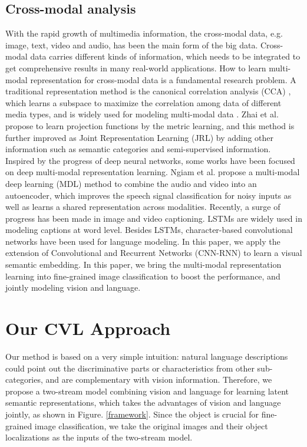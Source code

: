 \documentclass[10pt,twocolumn,letterpaper]{article}
\begin{document}
\subsection{Cross-modal analysis}
With the rapid growth of multimedia information, the cross-modal data, e.g. image, text, video and audio, has been the main form of the big data. Cross-modal data carries different kinds of information, which needs to be integrated to get comprehensive results in many real-world applications. How to learn multi-modal representation for cross-modal data is a fundamental research problem. 
A traditional representation method is the canonical correlation analysis (CCA) \cite{hotelling1936relations}, which learns a subspace to maximize the correlation among data of different media types, and is widely used for modeling multi-modal data \cite{bredin2007audio,hardoon2004canonical,klein2015associating}. Zhai et al. \cite{zhai2013heterogeneous} propose to learn projection functions by the metric learning, and this method is further improved as Joint Representation Learning (JRL) \cite{zhai2014learning} by adding other information such as semantic categories and semi-supervised information. Inspired by the progress of deep neural networks, some works have been focused on deep multi-modal representation learning.  Ngiam et al. \cite{ngiam2011multimodal} propose a multi-modal deep learning (MDL) method to combine the audio and video into an autoencoder, which improves the speech signal classification for noisy inputs as well as learns a shared representation across modalities. 
Recently, a surge of progress has been made in image and video captioning. LSTMs \cite{hochreiter1997long} are widely used in modeling captions at word level. Besides LSTMs, character-based convolutional networks \cite{zhang2015character} have been used for language modeling. In this paper, we apply the extension of Convolutional and Recurrent Networks (CNN-RNN) to learn a visual semantic embedding. 
In this paper, we bring the multi-modal representation learning into fine-grained image classification to boost the performance, and jointly modeling vision and language. 


\section{Our CVL Approach}
Our method is based on a very simple intuition: natural language descriptions could point out the discriminative parts or characteristics from other sub-categories, and are complementary with vision information. Therefore, we propose a two-stream model combining vision and language for learning latent semantic representations, which takes the advantages of vision and language jointly, as shown in Figure. \ref{framework}. Since the object is crucial for fine-grained image classification, we take the original images and their object localizations as the inputs of the two-stream model. 
\end{document}
